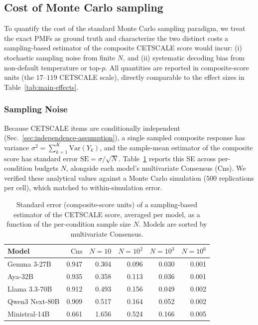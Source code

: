 \subsection{Cost of Monte Carlo sampling}
\label{app:sampling-cost}

To quantify the cost of the standard Monte Carlo sampling paradigm, 
we treat the exact PMFs as ground truth and characterize the two distinct costs a sampling-based estimator of the composite CETSCALE score would incur: 
(i) stochastic sampling noise from finite $N$, and
(ii) systematic decoding bias from non-default temperature or top-$p$. 
All quantities are reported in composite-score units (the $17$--$119$ CETSCALE scale), 
directly comparable to the effect sizes in Table~\ref{tab:main-effects}.

\subsubsection{Sampling Noise}
\label{app:sampling-noise}

Because CETSCALE items are conditionally independent
(Sec.~\ref{sec:independence-assumption}), 
a single sampled composite response has variance $\sigma^2=\sum_{k=1}^{K}\mathrm{Var}(Y_k)$, 
and the sample-mean estimator of the composite score has standard error
$\mathrm{SE}=\sigma/\sqrt{N}$. 
Table~\ref{tab:sampling-se} reports this SE across per-condition budgets $N$, alongside each model's multivariate Consensus
($\mathrm{Cns}$). 
We verified these analytical values against a Monte Carlo simulation ($500$ replications per cell), 
which matched to within-simulation error.

\begin{table}[htbp]
  \caption{Standard error (composite-score units) of a sampling-based estimator
  of the CETSCALE score, averaged per model, as a function of the per-condition
  sample size $N$. Models are sorted by multivariate Consensus.}
  \label{tab:sampling-se}
  \centering
  \begin{small}
  \begin{sc}
  \begin{tabular}{lrrrrr}
  \toprule
  Model & $\mathrm{Cns}$ & $N{=}10$ & $N{=}10^2$ & $N{=}10^3$ & $N{=}10^6$ \\
  \midrule
  Gemma 3-27B    & 0.947 & 0.304 & 0.096 & 0.030 & 0.001 \\
  Aya-32B        & 0.935 & 0.358 & 0.113 & 0.036 & 0.001 \\
  Llama 3.3-70B  & 0.912 & 0.493 & 0.156 & 0.049 & 0.002 \\
  Qwen3 Next-80B & 0.909 & 0.517 & 0.164 & 0.052 & 0.002 \\
  Ministral-14B  & 0.661 & 1.656 & 0.524 & 0.166 & 0.005 \\
  \bottomrule
  \end{tabular}
  \end{sc}
  \end{small}
\end{table}

